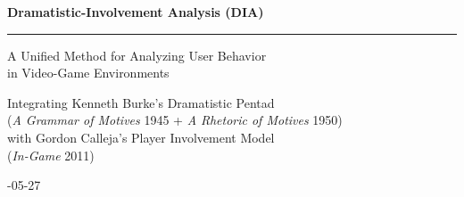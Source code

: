 \documentclass[11pt]{report}
\begin{document}
\begin{titlepage}
\centering
\vspace*{2.2cm}

{\headingfont\bfseries\color{diaaccent}\fontsize{30}{36}\selectfont
Dramatistic-Involvement Analysis (DIA)\par}

\vspace{1.0cm}
{\color{diarule}\rule{0.72\textwidth}{1pt}\par}
\vspace{1.0cm}

{\headingfont\Large
A Unified Method for Analyzing User Behavior\\[0.25em]
in Video-Game Environments\par}

\vspace{2.6cm}

{\large
Integrating Kenneth Burke's Dramatistic Pentad\\[0.35em]
(\textit{A Grammar of Motives} 1945 + \textit{A Rhetoric of Motives} 1950)\\[0.6em]
with Gordon Calleja's Player Involvement Model\\[0.35em]
(\textit{In-Game} 2011)\par}

\vfill

{\large{}-05-27\par}
\vspace{1.0cm}
\end{titlepage}

\hypersetup{linkcolor=diaaccent}
\renewcommand{\contentsname}{Contents}
\tableofcontents
\clearpage
\end{document}
